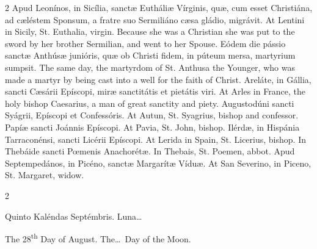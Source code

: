 \begin{paracol}{2}
\switchcolumn*
{}
Apud Leonínos, in 
 Sicília, sanctæ Eutháliæ Vírginis, quæ, cum esset Christiána, ad cæléstem 
 Sponsum, a fratre suo Sermiliáno cæsa gládio, migrávit.
\switchcolumn
{}
At Lentini in Sicily, St. Euthalia, 
 virgin. Because she was a Christian she was put to the sword by her 
 brother Sermilian, and went to her Spouse.
\switchcolumn*
{}
Eódem die pássio sanctæ 
 Anthúsæ junióris, quæ ob Christi fidem, in púteum mersa, martyrium sumpsit.
\switchcolumn
{}
The same day, the martyrdom of St. 
 Anthusa the Younger, who was made a martyr by being cast into a well for the 
 faith of Christ.
\switchcolumn*
{}
Areláte, in Gállia, 
 sancti Cæsárii Epíscopi, miræ sanctitátis et pietátis viri.
\switchcolumn
{}
At Arles in France, the holy bishop 
 Caesarius, a man of great sanctity and piety.
\switchcolumn*
{}
Augustodúni sancti 
 Syágrii, Epíscopi et Confessóris.
\switchcolumn
{}
At Autun, St. Syagrius, bishop and 
 confessor.
\switchcolumn*
{}
Papíæ sancti Joánnis 
 Epíscopi.
\switchcolumn
{}
At Pavia, St. John, bishop.
\switchcolumn*
{}
Ilérdæ, in Hispánia 
 Tarraconénsi, sancti Licérii Epíscopi.
\switchcolumn
{}
At Lerida in Spain, St. Licerius, 
 bishop.
\switchcolumn*
{}
In Thebáide sancti 
 Pœmenis Anachorétæ.
\switchcolumn
{}
In Thebais, St. Poemen, abbot.
\switchcolumn*
{}
Apud Septempedános, in 
 Picéno, sanctæ Margarítæ Víduæ.
\switchcolumn
{}
At San Severino, in Piceno, St. 
 Margaret, widow.
\switchcolumn*
{}
\end{paracol}


\begin{paracol}{2}
\begin{center}{\color{gregoriocolor} Quinto Kaléndas Septémbris. 
 Luna\dots\ }\end{center}
\switchcolumn
{}
\begin{center}{\color{gregoriocolor} The 
 28\textsuperscript{th} Day of 
 August. The\dots\ Day of the Moon.}\end{center}
\end{paracol}

